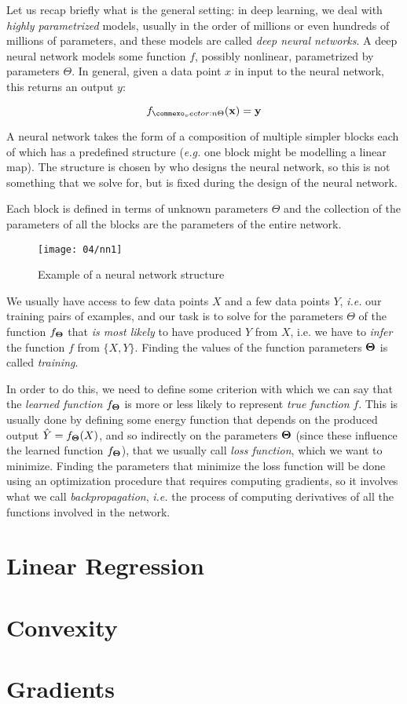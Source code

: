 
Let us recap briefly what is the general setting:
in deep learning, we deal with \emph{highly parametrized} models, usually in the order of millions or even hundreds of millions of parameters, and these models are called \emph{deep neural networks}. A deep neural network models some function $f$, possibly nonlinear, parametrized by parameters $\Theta$. In general, given a data point $x$ in input to the neural network, this returns an output $y$:

\begin{equation}
	f_{\Vector{\Theta}}(\vec{x}) = \vec{y}
\end{equation}

A neural network takes the form of a composition of multiple simpler blocks each of which has a predefined structure (\textit{e.g.} one block might be modelling a linear map). The structure is chosen by who designs the neural network, so this is not something that we solve for, but is fixed during the design of the neural network.

Each block is defined in terms of unknown parameters $\Theta$ and the collection of the parameters of all the blocks are the parameters of the entire network.

\begin{figure}[H]
	\centering
	\texttt{[image: 04/nn1]}
	\caption{Example of a neural network structure}\label{fig:nn-structure}	
\end{figure}

We usually have access to few data points $X$ and a few data points $Y$, \textit{i.e.} our training pairs of examples, and our task is to solve for the parameters $\Theta$ of the function $f_{\vb*{\Theta}}$ that \emph{is most likely} to have produced $Y$ from $X$, i.e. we have to \emph{infer} the function $f$ from $\{X, Y\}$. Finding the values of the function parameters $\vb*{\Theta}$ is called \emph{training}. 

In order to do this, we need to define some criterion with which we can say that the \emph{learned function} $f_{\vb*{\Theta}}$ is more or less likely to represent \emph{true function} $f$. This is usually done by defining some energy function that depends on the produced output $\hat{Y} = f_{\vb*{\Theta}}(X)$, and so indirectly on the parameters $\vb*{\Theta}$ (since these influence the learned function $f_{\vb*{\Theta}}$), that we usually call \emph{loss function}, which we want to minimize. 
Finding the parameters that minimize the loss function will be done using an optimization procedure that requires computing gradients, so it involves what we call \emph{backpropagation}, \textit{i.e.} the process of computing derivatives of all the functions involved in the network.

\section{Linear Regression} 

\section{Convexity} 

\section{Gradients} 

